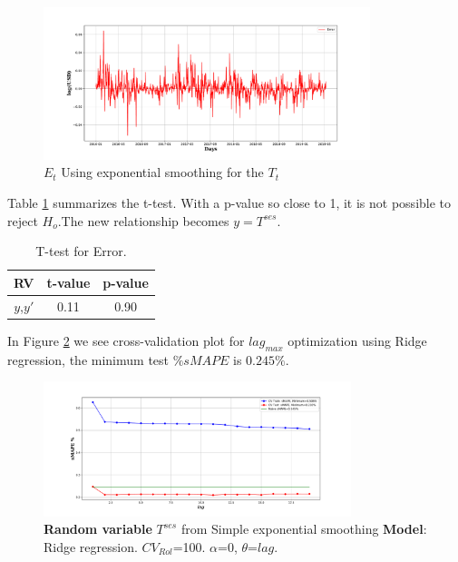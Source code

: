 \begin{figure}[h!] %
	\centering %
	\includegraphics[width=0.85\textwidth]{data/Residual_error_u_SES.pdf} %
	\caption{$E_{t}$ Using exponential smoothing for the $T_{t}$} %
	\label{fig:tren_simple_exp_error} %
\end{figure}

Table \ref{table:t_test_sms_error} summarizes the t-test. With a p-value so close to 1, it is not possible to reject $H_{o}$.The new relationship becomes $y=T^{ses}$.

\begin{table}[h!]
	\begin{center}
		\begin{tabular}{||c c c||} 
			\hline
			RV & t-value & p-value \\ [0.5ex] 
			\hline\hline
			$y$,$y'$ & 0.11 & 0.90  \\ 
			\hline
		\end{tabular}
		\caption{T-test for Error.}
		\label{table:t_test_sms_error}
	\end{center}
\end{table}


In Figure \ref{fig:trendses} we see cross-validation plot for $lag_{max}$ optimization using Ridge regression, the minimum test $\%sMAPE$ is $0.245\%$. 

\begin{figure}[htpb!] %
	\centering %
	\includegraphics[width=0.8\textwidth]{data/trend_ses.pdf} 
	\caption{\textbf{Random variable} $T^{ses}$ from Simple exponential smoothing \textbf{Model}: Ridge regression. \textbf{$CV_{Rol}$}=100. $\alpha$=0, $\theta$=$lag$.  } 
	\label{fig:trendses} %
\end{figure}

